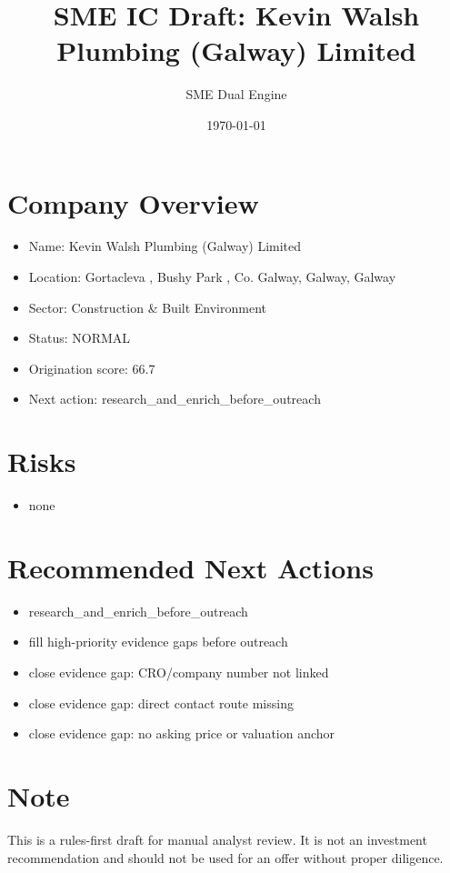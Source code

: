 \documentclass[11pt,a4paper]{article}
\title{SME IC Draft: Kevin Walsh Plumbing (Galway) Limited}
\author{SME Dual Engine}
\date{\today}
\begin{document}
\maketitle
\section*{Company Overview}
\begin{itemize}[leftmargin=1.4em]
\item Name: Kevin Walsh Plumbing (Galway) Limited
\item Location: Gortacleva , Bushy Park , Co. Galway, Galway, Galway
\item Sector: Construction \& Built Environment
\item Status: NORMAL
\item Origination score: 66.7
\item Next action: research\_and\_enrich\_before\_outreach
\end{itemize}
\section*{Risks}
\begin{itemize}[leftmargin=1.4em]
\item none
\end{itemize}
\section*{Recommended Next Actions}
\begin{itemize}[leftmargin=1.4em]
\item research\_and\_enrich\_before\_outreach
\item fill high-priority evidence gaps before outreach
\item close evidence gap: CRO/company number not linked
\item close evidence gap: direct contact route missing
\item close evidence gap: no asking price or valuation anchor
\end{itemize}
\section*{Note}
This is a rules-first draft for manual analyst review. It is not an investment
recommendation and should not be used for an offer without proper diligence.
\end{document}
